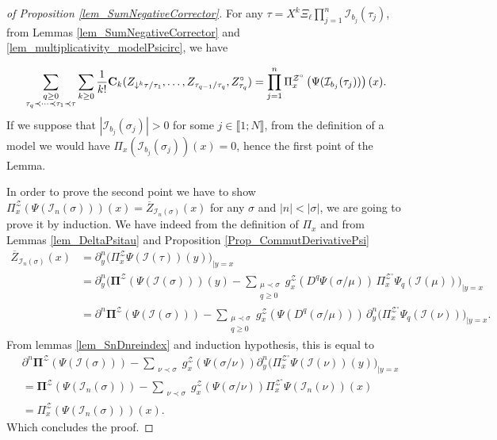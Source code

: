 \documentclass[11pt]{preprint}
\newcommand{\mcI}{\mathcal{I}}
\newcommand{\mcZ}{\mathcal{Z}}
\def\PPi{\boldsymbol{\Pi}}
\newcommand{\bbrack}[1]{ \llbracket #1 \rrbracket }
\begin{document}
\begin{proof}[of Proposition \ref{lem_SumNegativeCorrector}]
For any $\tau= X^k \Xi_\ell \prod_{j=1}^n\mcI_{b_j}(\tau_j) $, from Lemmas \ref{lem_SumNegativeCorrector} and \ref{lem_multiplicativity_modelPsicirc}, we have  
 
 
	\begin{align*}
			\sum_{\substack{q\geq 0 \\ \tau_q\prec\dots\prec\tau_1\prec\tau}}\sum_{k\geq 0} \frac{1}{k!}{\bf C}_k(Z_{\downarrow^k\tau/\tau_1},\dots,Z_{\tau_{q-1}/\tau_q}, Z_{\tau_q}^\circ)  = \prod_{j=1}^n {\Pi}_x^{\mcZ^\circ} \left(\Psi(\mcI_{b_j}(\tau_j))\right)(x).
	\end{align*}
	If we suppose that $|\mcI_{b_j}(\sigma_j)|> 0 $ for some $j\in\bbrack{1;N}$, from the definition of a model we would have ${\Pi}_x(\mcI_{b_j}(\sigma_j))(x)=0$, hence the first point of the Lemma.
	
	In order to prove the second point we have to show $\Pi_x^\mcZ(\Psi(\mcI_n(\sigma)))(x) = \overline{Z}_{\mcI_n(\sigma)}(x)$ for any $\sigma$ and $|n|<|\sigma|$, we are going to prove it by induction. We have indeed from the definition of $\Pi_x$ and from Lemmas \ref{lem_DeltaPsitau} and Proposition \ref{Prop_CommutDerivativePsi}
	\begin{align*}
		\overline{Z}_{\mcI_n(\sigma)}(x)&= \partial^{n}_y\Big( { \Pi}_x^\mcZ \Psi(\mcI (\tau))(y)\Big)_{|y=x}
		\\
		&= \partial^n_y\Big( \PPi^\mcZ\left(\Psi(\mcI(\sigma))\right)(y)  - \sum_{\substack{\mu\prec\sigma \\ q\geq  0}} g_x^\mcZ\left(D^q\Psi(\sigma/\mu)\right) \, \Pi^{\mcZ^\circ}_x \Psi_q(\mcI(\mu))    \Big)_{|y=x}
		\\
		&= \partial^n \PPi^\mcZ\left(\Psi(\mcI(\sigma))\right)  - \sum_{\substack{\mu\prec\sigma \\ q\geq  0}} g^\mcZ_x\left(\Psi(D^q(\sigma/\mu))\right) \,  \partial^n_y\Big(\Pi^{\mcZ^\circ}_x \Psi_q(\mcI(\nu))    \Big)_{|y=x}.
	\end{align*}
	From lemmas \ref{lem_SnDnreindex} and induction hypothesis, this is equal to
	\begin{align*}
		& \partial^n \PPi^\mcZ\left(\Psi(\mcI(\sigma))\right)  - \sum_{\substack{\nu\prec\sigma }} g_x^\mcZ\left(\Psi(\sigma/\nu)\right)  \partial^n_y\Big(\Pi^{\mcZ^\circ}_x \Psi(\mcI(\nu))(y)    \Big)_{|y=x}
		\\
		&=  \PPi^\mcZ\left(\Psi(\mcI_n(\sigma))\right) - \sum_{\substack{\nu\prec\sigma }} g_x^\mcZ(\Psi(\sigma/\nu))  \Pi^{\mcZ^\circ}_x \Psi(\mcI_n(\nu))(x)    
		\\
		&= \Pi_x^\mcZ\left(\Psi(\mcI_n(\sigma))\right)(x).
	\end{align*}
Which concludes the proof.
\end{proof}
	
\end{document}
